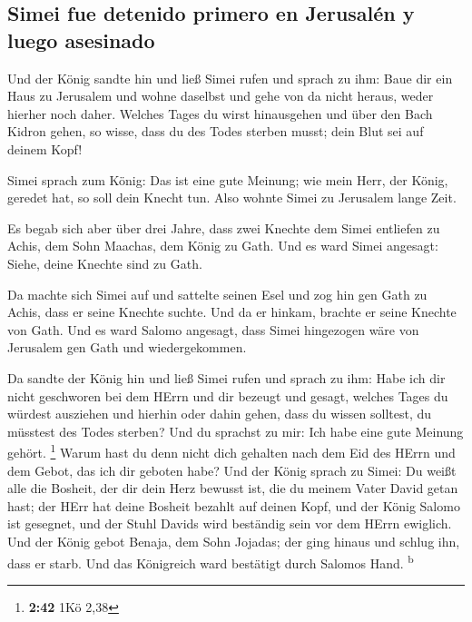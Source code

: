 \hypertarget{simei-fue-detenido-primero-en-jerusaluxe9n-y-luego-asesinado}{%
\subsection{Simei fue detenido primero en Jerusalén y luego
asesinado}\label{simei-fue-detenido-primero-en-jerusaluxe9n-y-luego-asesinado}}

 Und der König sandte hin und ließ Simei rufen und sprach
zu ihm: Baue dir ein Haus zu Jerusalem und wohne daselbst und gehe von
da nicht heraus, weder hierher noch daher.  Welches Tages
du wirst hinausgehen und über den Bach Kidron gehen, so wisse, dass du
des Todes sterben musst; dein Blut sei auf deinem Kopf!

 Simei sprach zum König: Das ist eine gute Meinung; wie
mein Herr, der König, geredet hat, so soll dein Knecht tun. Also wohnte
Simei zu Jerusalem lange Zeit.

 Es begab sich aber über drei Jahre, dass zwei Knechte
dem Simei entliefen zu Achis, dem Sohn Maachas, dem König zu Gath. Und
es ward Simei angesagt: Siehe, deine Knechte sind zu Gath.

 Da machte sich Simei auf und sattelte seinen Esel und
zog hin gen Gath zu Achis, dass er seine Knechte suchte. Und da er
hinkam, brachte er seine Knechte von Gath.  Und es ward
Salomo angesagt, dass Simei hingezogen wäre von Jerusalem gen Gath und
wiedergekommen.

 Da sandte der König hin und ließ Simei rufen und sprach
zu ihm: Habe ich dir nicht geschworen bei dem HErrn und dir bezeugt und
gesagt, welches Tages du würdest ausziehen und hierhin oder dahin gehen,
dass du wissen solltest, du müsstest des Todes sterben? Und du sprachst
zu mir: Ich habe eine gute Meinung gehört. \footnote{\textbf{2:42} 1Kö
  2,38}  Warum hast du denn nicht dich gehalten nach dem
Eid des HErrn und dem Gebot, das ich dir geboten habe? 
Und der König sprach zu Simei: Du weißt alle die Bosheit, der dir dein
Herz bewusst ist, die du meinem Vater David getan hast; der HErr hat
deine Bosheit bezahlt auf deinen Kopf,  und der König
Salomo ist gesegnet, und der Stuhl Davids wird beständig sein vor dem
HErrn ewiglich.  Und der König gebot Benaja, dem Sohn
Jojadas; der ging hinaus und schlug ihn, dass er starb. Und das
Königreich ward bestätigt durch Salomos Hand. \textsuperscript{b}

